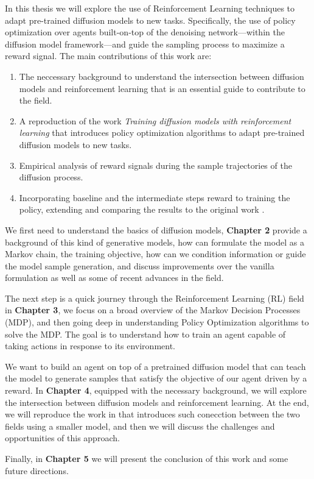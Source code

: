 In this thesis we will explore the use of Reinforcement Learning techniques to adapt pre-trained diffusion models to new tasks. Specifically, the use of policy optimization over agents built-on-top of the denoising network---within
the diffusion model framework---and guide the sampling process to maximize a reward signal. The main contributions of this work are:

\begin{enumerate}
    \item The neccessary background to understand the intersection between diffusion models and reinforcement learning that is an essential guide to contribute to the field.
    \item A reproduction of the work \textit{Training diffusion models with reinforcement learning} \cite{black2023training} that introduces policy optimization algorithms to adapt pre-trained diffusion models to new tasks.
    \item Empirical analysis of reward signals during the sample trajectories of the diffusion process.
    \item Incorporating baseline and the intermediate steps reward to training the policy, extending and comparing the results to the original work \citep{black2023training}.
\end{enumerate}

We first need to understand the basics of diffusion models, \textbf{Chapter 2} provide a background of this kind of generative models, how can formulate the model as a Markov chain, the training objective, how can we condition information or guide the model sample generation, and discuss improvements over the vanilla formulation as well as some of recent advances in the field. 

The next step is a quick journey through the Reinforcement Learning (RL) field in \textbf{Chapter 3}, we focus on a broad overview of the Markov Decision Processes (MDP), and then going deep in understanding Policy Optimization algorithms to solve the MDP. The goal is to understand how to train an agent capable of taking actions in response to its environment. 

We want to build an agent on top of a pretrained diffusion model that can teach the model to generate samples that satisfy the objective of our agent driven by a reward. In \textbf{Chapter 4}, equipped with the necessary background, we will explore the intersection between diffusion models and reinforcement learning. At the end, we will reproduce the work in \cite{black2023training} that introduces such conecction between the two fields using a smaller model, and then we will discuss the challenges and opportunities of this approach. 

Finally, in \textbf{Chapter 5} we will present the conclusion of this work and some future directions.
